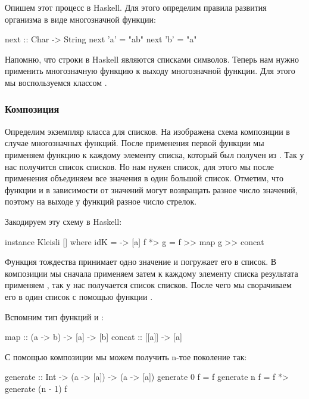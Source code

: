 Опишем этот процесс в Haskell. Для этого определим правила развития
организма в виде многозначной функции:

\begin{code}
next :: Char -> String
next 'a' = "ab"
next 'b' = "a"
\end{code}

Напомню, что строки в Haskell являются списками символов.
Теперь нам нужно применить многозначную функцию к выходу
многозначной функции. Для этого мы воспользуемся классом
.



\subsubsection{Композиция}


Определим экземпляр класса  для списков. 
На  изображена схема композиции в случае
многозначных функций.
После применения первой функции 
мы применяем функцию к каждому элементу списка, который был получен
из . Так у нас получится список списков. Но нам нужен
список, для этого мы после применения  объединяем
все значения в один большой список. Отметим, что функции 
и  в зависимости от значений могут возвращать разное 
число значений, поэтому на выходе у функций  разное
число стрелок.

Закодируем эту схему в Haskell:

\begin{code}
instance Kleisli [] where
    idK     = \a -> [a]
    f *> g  = f >> map g >> concat
\end{code}

Функция тождества принимает одно значение и погружает его в список.
В композиции мы сначала применяем  затем к каждому элементу
списка результата применяем , так у нас получается список списков.
После чего мы сворачиваем его в один список с помощью функции .

Вспомним тип функций  и :

\begin{code}
map     :: (a -> b) -> [a] -> [b]
concat  :: [[a]] -> [a]
\end{code}

С помощью композиции мы можем получить n-тое поколение так:

\begin{code}
generate :: Int -> (a -> [a]) -> (a -> [a])
generate 0 f = f
generate n f = f *> generate (n - 1) f
\end{code}

